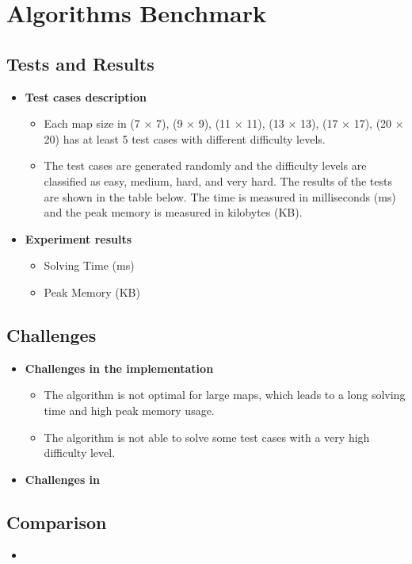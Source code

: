 \section{Algorithms Benchmark}
\subsection{Tests and Results}
\begin{itemize}
    \item \textbf{Test cases description}
          \begin{itemize}
              \item Each map size in (7 × 7), (9 × 9), (11 × 11), (13 × 13), (17 × 17), (20 × 20) has at least 5 test cases with different difficulty levels.
              \item The test cases are generated randomly and the difficulty levels are classified as easy, medium, hard, and very hard. The results of the tests are shown in the table below. The time is measured in milliseconds (ms) and the peak memory is measured in kilobytes (KB).
          \end{itemize}

    \item \textbf{Experiment results}
          \begin{itemize}
              \item Solving Time (ms)
              \item Peak Memory (KB)
          \end{itemize}
\end{itemize}

\subsection{Challenges}
\begin{itemize}
    \item \textbf{Challenges in the implementation}
          \begin{itemize}
              \item The algorithm is not optimal for large maps, which leads to a long solving time and high peak memory usage.
              \item The algorithm is not able to solve some test cases with a very high difficulty level.
          \end{itemize}
    \item \textbf{Challenges in }
\end{itemize}

\subsection{Comparison}
\begin{itemize}
    \item
\end{itemize}
